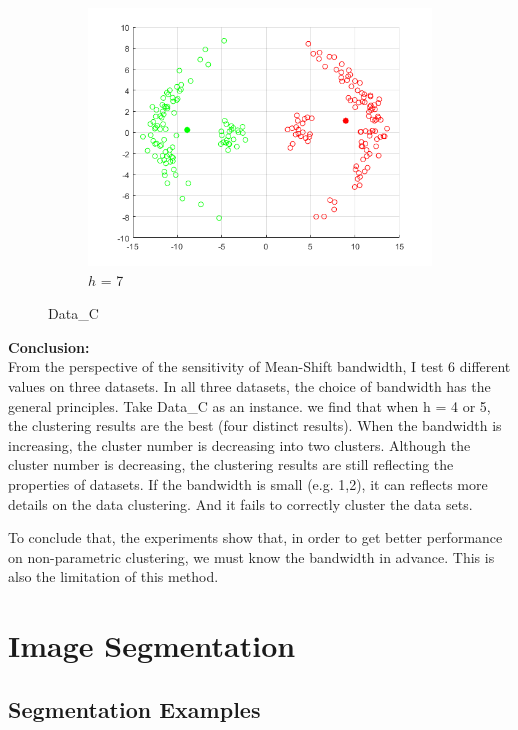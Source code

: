 \documentclass[12pt]{article}
\begin{document}
\begin{figure}[H]
\begin{subfigure}{0.25\textwidth}
  \includegraphics[width=\linewidth]{figs/1-b-meanshift-c-7.png}
  \caption{$h$ = 7}
  \label{fig:6}
\end{subfigure}
\caption{Data\_C }
\label{fig:images}
\end{figure}

\textbf{Conclusion:}\\

From the perspective of the sensitivity of Mean-Shift bandwidth, I test 6 different values on three datasets. In all three datasets, the choice of bandwidth has the general principles. Take Data\_C as an instance. we find that when h = 4 or 5, the clustering results are the best (four distinct results). When the bandwidth is increasing, the cluster number is decreasing into two clusters. Although the cluster number is decreasing, the clustering results are still reflecting the properties of datasets. If the bandwidth is small (e.g. 1,2), it can reflects more details on the data clustering. And it fails to correctly cluster the data sets.

To conclude that, the experiments show that, in order to get better performance on non-parametric clustering, we must know the bandwidth in advance. This is also the limitation of this method.

\section{\fontsize{16}{16}\selectfont Image Segmentation}

\subsection{Segmentation Examples}
\end{document}
